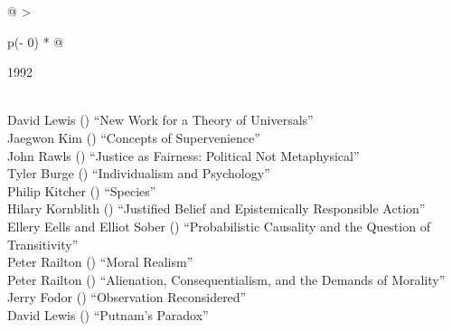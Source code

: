 \documentclass[
  10pt,
  letterpaper,
  DIV=11,
  numbers=noendperiod,
  twoside]{scrartcl}
\begin{document}
\begin{longtable}[]{@{}
  >{\raggedright\arraybackslash}p{(\columnwidth - 0\tabcolsep) * }@{}}

\caption{\label{tbl-top-ten-1983}Most cited articles published less than
ten years ago as of 1992.}

\tabularnewline

\toprule\noalign{}
\begin{minipage}[b]{\linewidth}\raggedright
1992
\end{minipage} \\
\midrule\noalign{}
\endhead
\bottomrule\noalign{}
\endlastfoot
David Lewis
()
``New Work for a Theory of Universals'' \\
Jaegwon Kim
()
``Concepts of Supervenience'' \\
John Rawls
()
``Justice as Fairness: Political Not Metaphysical'' \\
Tyler Burge
()
``Individualism and Psychology'' \\
Philip Kitcher
()
``Species'' \\
Hilary Kornblith
()
``Justified Belief and Epistemically Responsible Action'' \\
Ellery Eells and Elliot Sober
()
``Probabilistic Causality and the Question of Transitivity'' \\
Peter Railton
()
``Moral Realism'' \\
Peter Railton
()
``Alienation, Consequentialism, and the Demands of Morality'' \\
Jerry Fodor
()
``Observation Reconsidered'' \\
David Lewis
()
``Putnam's Paradox'' \\

\end{longtable}
\end{document}
